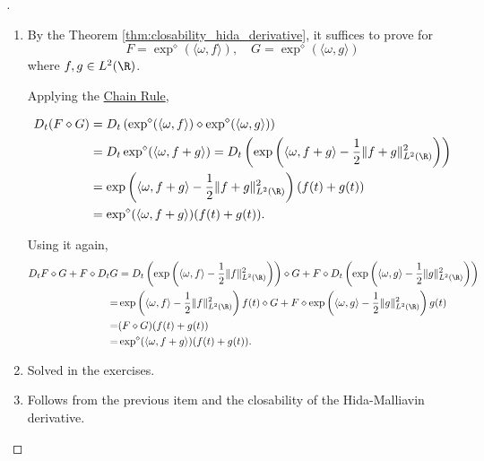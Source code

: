   \begin{proof}[]
    \begin{enumerate}
      \item By the Theorem \ref{thm:closability_hida_derivative}, it suffices to prove for 
        \[
          F = \exp^\diamond (\langle \omega, f \rangle), \quad G = \exp^\diamond (\langle \omega, g \rangle)
        \]
        where $f, g \in L^2(\R)$. 

        Applying the \hyperref[thm:hida-chain-rule]{Chain Rule},

\begin{equation*}
\begin{aligned}
D_t(F \diamond G) & = D_t\left(\exp ^{\diamond}(\langle \omega, f \rangle) \diamond \exp ^{\diamond}(\langle \omega, g \rangle)\right) \\
& =D_t \exp ^{\diamond}(\langle \omega, f+g \rangle)=D_t\left(\exp \left( \langle \omega, f+g \rangle - \frac{1}{2}\|f+g\|_{L^2(\R)}^2\right) \right) \\
& =\exp \left( \langle \omega, f+g \rangle - \frac{1}{2}\|f+g\|_{L^2(\R)}^2\right) (f(t)+g(t)) \\
& =\exp ^{\diamond}(\langle \omega, f+g \rangle)(f(t)+g(t)) .
\end{aligned}
\end{equation*}

Using it again,
\begin{equation*}
\begin{aligned}
  D_t F \diamond G+F \diamond D_t G & = D_t\left(\exp \left( \langle \omega, f \rangle -\frac{1}{2}\|f\|_{L^2(\R)}^2\right)\right) \diamond G + F \diamond D_t\left(\exp \left( \langle \omega, g \rangle -\frac{1}{2}\|g\|_{L^2(\R)}^2\right) \right) \\
= & \exp \left( \langle \omega, f \rangle -\frac{1}{2}\|f\|_{L^2(\R)}^2\right) f(t) \diamond G +F \diamond \exp \left( \langle \omega, g \rangle -\frac{1}{2}\|g\|_{L^2(\R)}^2\right) g(t) \\
= & (F \diamond G)(f(t)+g(t)) \\
= & \exp ^{\diamond}(\langle \omega, f+g \rangle)(f(t)+g(t)) .
\end{aligned}
\end{equation*}

      \item Solved in the exercises.

      \item Follows from the previous item and the closability of the Hida-Malliavin derivative. 
    \end{enumerate}
  \end{proof}

